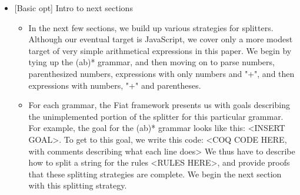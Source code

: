 \begin{itemize}
  \item  {}[Basic opt] Intro to next sections
    \begin{itemize} \item  In the next few sections, we build up various strategies for splitters.  Although our eventual target is JavaScript, we cover only a more modest target of very simple arithmetical expressions in this paper.  We begin by tying up the (ab)* grammar, and then moving on to parse numbers, parenthesized numbers, expressions with only numbers and "+", and then expressions with numbers, "+" and parentheses. 
    \item  For each grammar, the Fiat framework presents us with goals describing the unimplemented portion of the splitter for this particular grammar.  For example, the goal for the (ab)* grammar looks like this: <INSERT GOAL>.  To get to this goal, we write this code: <COQ CODE HERE, with comments describing what each line does>  We thus have to describe how to split a string for the rules <RULES HERE>, and provide proofs that these splitting strategies are complete.  We begin the next section with this splitting strategy. \end{itemize} \end{itemize}